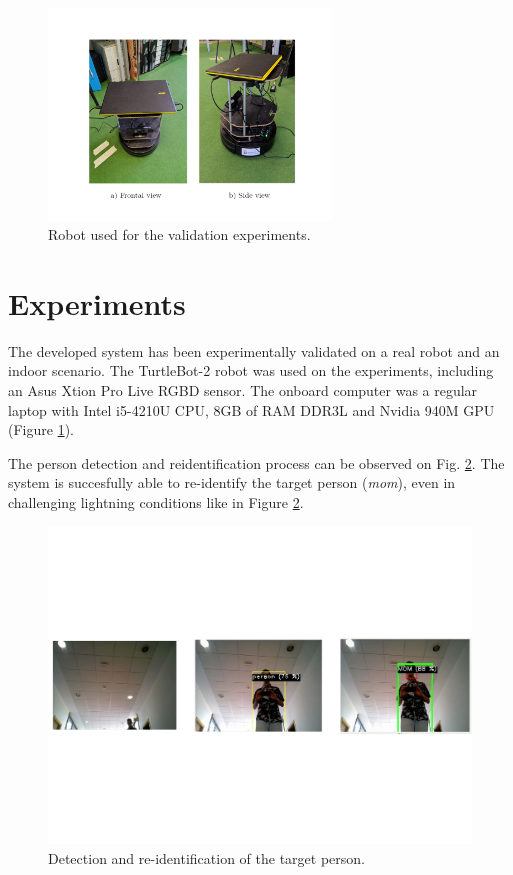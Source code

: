 \begin{figure}[h!]
	\centering
	\includegraphics[width=7.5cm]{images/exp_set}
	\caption{Robot used for the validation experiments.}
	\label{fig:exp_set}
\end{figure}


\section{Experiments}
\label{sec:experiments}

The developed system has been experimentally validated on a real robot and an indoor scenario. The TurtleBot-2 robot was used on the experiments, including an Asus Xtion Pro Live RGBD sensor. The onboard computer was a regular laptop with Intel i5-4210U CPU, 8GB of RAM DDR3L and Nvidia 940M GPU (Figure \ref{fig:exp_set}). 



The person detection and reidentification process can be observed on Fig. \ref{fig:exp_figures}. The system is succesfully able to re-identify the target person (\textit{mom}), even in challenging lightning conditions like in Figure \ref{fig:exp_figures}.

\begin{figure}[h!]
	\centering
	\includegraphics[width=12cm]{images/exp_tracking}
	\caption{Detection and re-identification of the target person.}
	\label{fig:exp_figures}
\end{figure}

